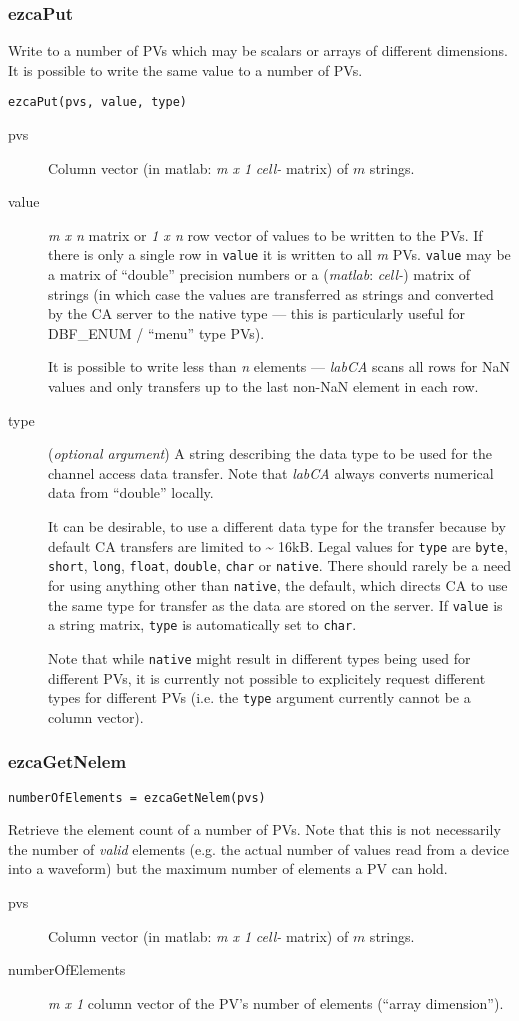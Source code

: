 \documentclass{article}
\newcommand{\sca}{\ita{labCA}}
\newcommand{\matlab}{\ita{matlab}}
\newcommand{\com}[1]{{\tt #1}}
\newcommand{\NAN}{\mbox{NaN}}
\newcommand{\ita}[1]{\emph{#1}}
\newcommand{\m}{$m$}
\newcommand{\mhack}{$m$} %
\newcommand{\n}{$n$}
\newcommand{\mxn}{$m\times n$}
\newcommand{\mxl}{$m\times 1$}
\newcommand{\lxn}{$1\times n$}
\newcommand{\calimit}{$\approx 16$kB}
\renewcommand{\m}{\ita{m}}
\newcommand{\mhack}{\ita{m}} %
\renewcommand{\n}{\ita{n}}
\renewcommand{\mxn}{\ita{m x n}}
\renewcommand{\mxl}{\ita{m x 1}}
\renewcommand{\lxn}{\ita{1 x n}}
\renewcommand{\calimit}{\~{} 16kB}
\newcommand{\PVITEM}{
\item[pvs] Column vector (in matlab: \mxl{} \ita{cell-} matrix)
of \mhack{} strings.
}
\begin{document}
\subsubsection{ezcaPut}
\label{ezcaput}
Write to a number of PVs which may be scalars or arrays of different
dimensions. It is possible to write the same value to a number of PVs.
\begin{verbatim}
ezcaPut(pvs, value, type)
\end{verbatim}
\begin{description}
\PVITEM
%
%
\item[value] \mxn{} matrix or \lxn{} row vector of values
to be written to the PVs. If there is only a single row in \com{value}{}
it is written to all \m{} PVs. \com{value} may be a matrix of ``double''
precision numbers or  a (\matlab: \ita{cell-}) matrix of strings (in
which case the values are transferred as strings and converted by the
CA server to the native type --- this is particularly useful for
DBF\_ENUM / ``menu'' type PVs).

It is possible to write less than \n{} elements --- \sca{} scans all rows
for \NAN{} values and only transfers up to the last non-\NAN{} element in each
row.
%
%
\item[type] (\ita{optional argument}) A string describing the
data type to be used for the channel access data transfer. Note
that \sca{} always converts numerical data from ``double'' locally.

It can be desirable, to use a different data type for the
transfer because by default CA transfers are limited to \calimit.
Legal values for \com{type}{} are \com{byte}, \com{short}, \com{long},
\com{float}, \com{double}, \com{char} or \com{native}. There should rarely
be a need for using anything other than \com{native}, the default,
which directs CA to use the same type for transfer as the data are
stored on the server. If \com{value} is a string matrix, \com{type}
is automatically set to \com{char}.

Note that while \com{native}{} might result in different types
being used for different PVs, it is currently not possible to
explicitely request different types for different PVs (i.e. the
\com{type}{} argument currently cannot be a column vector).
%
\end{description}

\subsubsection{ezcaGetNelem}
\begin{verbatim}
numberOfElements = ezcaGetNelem(pvs)
\end{verbatim}
Retrieve the element count of a number of PVs. Note that this is not
necessarily the number of \ita{valid} elements (e.g. the actual number
of values read from a device into a waveform) but the maximum number
of elements a PV can hold.
\begin{description}
\PVITEM
\item[numberOfElements] \mxl{} column vector of the PV's number
of elements (``array dimension'').
\end{description}
\end{document}
